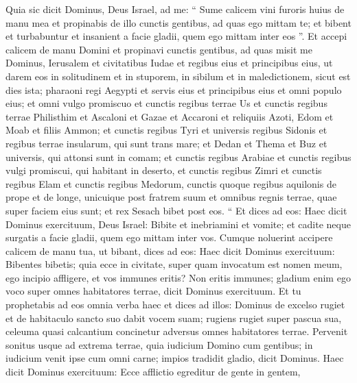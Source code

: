\begin{biblechapter}
\begin{biblechapter}
\begin{biblechapter}
\begin{biblechapter}
\begin{biblechapter}
\begin{biblechapter}
\begin{biblechapter}
\begin{biblechapter}
\begin{biblechapter}
\begin{biblechapter}
\begin{biblechapter}
\begin{biblechapter}
\begin{biblechapter}
\begin{biblechapter}
\begin{biblechapter}
\begin{biblechapter}
\begin{biblechapter}
\begin{biblechapter}
\begin{biblechapter}
\begin{biblechapter}
\begin{biblechapter}
\begin{biblechapter}
\begin{biblechapter}
\begin{biblechapter}
\begin{biblechapter}
 \verse Quia sic dicit Dominus, Deus Israel, ad me: “ Sume calicem vini furoris huius de manu mea et propinabis de illo cunctis gentibus, ad quas ego mittam te; \verse et bibent et turbabuntur et insanient a facie gladii, quem ego mittam inter eos ”.
 \verse Et accepi calicem de manu Domini et propinavi cunctis gentibus, ad quas misit me Dominus, 
\verse Ierusalem et civitatibus Iudae et regibus eius et principibus eius, ut darem eos in solitudinem et in stuporem, in sibilum et in maledictionem, sicut est dies ista; 
\verse pharaoni regi Aegypti et servis eius et principibus eius et omni populo eius; 
\verse et omni vulgo promiscuo et cunctis regibus terrae Us et cunctis regibus terrae Philisthim et Ascaloni et Gazae et Accaroni et reliquiis Azoti, 
\verse Edom et Moab et filiis Ammon; 
 \verse et cunctis regibus Tyri et universis regibus Sidonis et regibus terrae insularum, qui sunt trans mare; 
\verse et Dedan et Thema et Buz et universis, qui attonsi sunt in comam; 
\verse et cunctis regibus Arabiae et cunctis regibus vulgi promiscui, qui habitant in deserto, 
\verse et cunctis regibus Zimri et cunctis regibus Elam et cunctis regibus Medorum, 
\verse cunctis quoque regibus aquilonis de prope et de longe, unicuique post fratrem suum et omnibus regnis terrae, quae super faciem eius sunt; et rex Sesach bibet post eos.
 \verse “ Et dices ad eos: Haec dicit Dominus exercituum, Deus Israel: Bibite et inebriamini et vomite; et cadite neque surgatis a facie gladii, quem ego mittam inter vos. 
\verse Cumque noluerint accipere calicem de manu tua, ut bibant, dices ad eos: Haec dicit Dominus exercituum: Bibentes bibetis; 
\verse quia ecce in civitate, super quam invocatum est nomen meum, ego incipio affligere, et vos immunes eritis? Non eritis immunes; gladium enim ego voco super omnes habitatores terrae, dicit Dominus exercituum.
 \verse Et tu prophetabis ad eos omnia verba haec et dices ad illos:
 Dominus de excelso rugiet
 et de habitaculo sancto suo dabit vocem suam;
 rugiens rugiet super pascua sua,
 celeuma quasi calcantium concinetur
 adversus omnes habitatores terrae.
 \verse Pervenit sonitus usque ad extrema terrae,
 quia iudicium Domino cum gentibus;
 in iudicium venit ipse cum omni carne;
 impios tradidit gladio,
 dicit Dominus.
 \verse Haec dicit Dominus exercituum:
 Ecce afflictio egreditur de gente in gentem,

\end{biblechapter}
\end{biblechapter}
\end{biblechapter}
\end{biblechapter}
\end{biblechapter}
\end{biblechapter}
\end{biblechapter}
\end{biblechapter}
\end{biblechapter}
\end{biblechapter}
\end{biblechapter}
\end{biblechapter}
\end{biblechapter}
\end{biblechapter}
\end{biblechapter}
\end{biblechapter}
\end{biblechapter}
\end{biblechapter}
\end{biblechapter}
\end{biblechapter}
\end{biblechapter}
\end{biblechapter}
\end{biblechapter}
\end{biblechapter}
\end{biblechapter}
